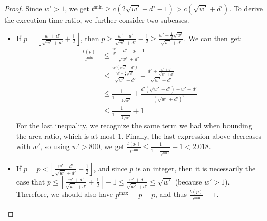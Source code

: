 \documentclass{article}
\begin{document}
\begin{proof}
Since $w'>1$, we get $t^{\min}\ge c(2\sqrt{w'}+d'-1)>c(\sqrt{w'}+d')$. To derive the execution time ratio, we further consider two subcases.
\begin{itemize}
\item If $p=\left\lfloor \frac{w'+d'}{\sqrt{w'}+d'} +\frac{1}{2}\right\rfloor$, then $p\geq \frac{w'+d'}{\sqrt{w'}+d'} - \frac{1}{2} \geq \frac{w'-\frac{1}{2}\sqrt{w'}}{\sqrt{w'}+d'}$. We can then get:
\begin{align*}
\frac{t(p)}{t^{\min}} &\leq \frac{\frac{w'}{p}+d'+p-1}{\sqrt{w'}+d'} \\
&\leq \frac{\frac{w'(\sqrt{w'}+d')}{w'-\frac{1}{2}\sqrt{w'}}}{\sqrt{w'}+d'}+\frac{d'+\frac{w'+d'}{\sqrt{w'}+d'}}{\sqrt{w'}+d'} \\
&\leq \frac{1}{1-\frac{1}{2\sqrt{w'}}}+\frac{d'(\sqrt{w'}+d')+w'+d'}{(\sqrt{w'}+d')^2}\\
&\leq \frac{1}{1-\frac{1}{2\sqrt{w'}}}+1
\end{align*}
For the last inequality, we recognize the same term we had when bounding the area ratio, which is at most $1$. Finally, the last expression above decreases with $w'$, so using $w'>800$, we get $\frac{t(p)}{t^{\min}} \le \frac{1}{1-\frac{1}{\sqrt{800}}}+1<2.018$.
\item If $p = \bar{p} < \left\lfloor \frac{w'+d'}{\sqrt{w'}+d'} +\frac{1}{2}\right\rfloor$, and since $\bar{p}$ is an integer, then it is necessarily the case that $\bar{p} \le \left\lfloor \frac{w'+d'}{\sqrt{w'}+d'} +\frac{1}{2}\right\rfloor - 1 \le \frac{w'+d'}{\sqrt{w'}+d'} \leq \sqrt{w'}$ (because $w'>1$). Therefore, we should also have $p^{\max} = \bar{p} = p$, and thus $\frac{t(p)}{t^{\min}}=1$. \qedhere
\end{itemize}
\end{proof}





\end{document}
